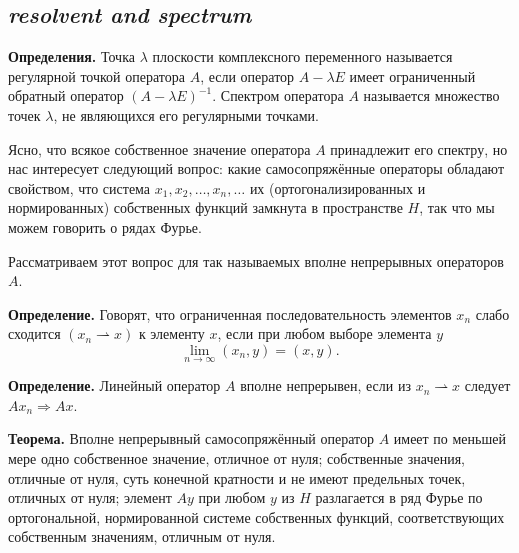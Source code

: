 \subsection*{ \textit{resolvent and spectrum}}
\begin{rusblock}
\textbf{Определения.} Точка $\lambda$ плоскости комплексного переменного называется регулярной точкой оператора $A$, если оператор $A-\lambda E$ имеет ограниченный обратный оператор $(A-\lambda E)^{-1}$. Спектром оператора $A$ называется множество точек $\lambda$, не являющихся его регулярными точками.

Ясно, что всякое собственное значение оператора $A$ принадлежит его спектру, но нас интересует следующий вопрос: какие самосопряжённые операторы обладают свойством, что система $x_1,x_2,\ldots,x_n,\ldots$ их (ортогонализированных и нормированных) собственных функций замкнута в пространстве $H$, так что мы можем говорить о рядах Фурье.

Рассматриваем этот вопрос для так называемых вполне непрерывных операторов $A$.

\textbf{Определение.} Говорят, что ограниченная последовательность элементов $x_n$ слабо сходится $(x_n\rightharpoonup x)$ к элементу $x$, если при любом выборе элемента $y$
\[
\lim_{n\to\infty}(x_n,y)=(x,y).
\]

\textbf{Определение.} Линейный оператор $A$ вполне непрерывен, если из $x_n\rightharpoonup x$ следует $Ax_n\Rightarrow Ax$.

\textbf{Теорема.} Вполне непрерывный самосопряжённый оператор $A$ имеет по меньшей мере одно собственное значение, отличное от нуля; собственные значения, отличные от нуля, суть конечной кратности и не имеют предельных точек, отличных от нуля; элемент $Ay$ при любом $y$ из $H$ разлагается в ряд Фурье по ортогональной, нормированной системе собственных функций, соответствующих собственным значениям, отличным от нуля.
\end{rusblock}

